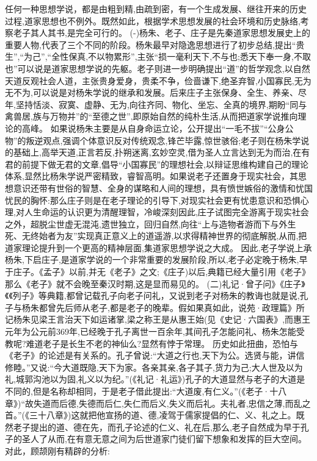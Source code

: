 \documentclass[a4paper,12pt,UTF8,twoside]{ctexbook}
\begin{document}
任何一种思想学说，都是由粗到精,由疏到密，有一个生成发展、继往开来的历史过程,道家思想也不例外。既然如此，根据学术思想发展的社会环境和历史脉络,考察老子其人其书,是完全可行的。
(-)杨朱、老子、庄子是先秦道家思想发展史上的重要人物,代表了三个不同的阶段。杨朱最早对隐逸思想进行了初步总结,提出“贵生”,“为己”,“全性保真,不以物累形”,主张“损一毫利天下,不与也;悉天下奉一身,不取也”可以说是道家思想学说的先躯。老子则进一步明确提出“道”的哲学观念,以自然天道反观社会人道，主张贵身爱身，贵柔不争，俭啬谦下,绝圣弃智,小国寡民,无为无不为,可以说是对杨朱学说的继承和发展。后来庄子主张保身、全生、养亲、尽年,坚持恬淡、寂寞、虚静、无为,向往齐同、物化、坐忘、全真的境界,期盼“同与禽兽居,族与万物并”的“至德之世”,即原始自然的纯朴生活,从而把道家学说推向理论的高峰。
如果说杨朱主要是从自身命运立论，公开提出“一毛不拔”“公身公物”的叛逆观点,强调个体意识反对传统观念,锋芒毕露,惊世骇俗;老子则在杨朱学说的基础上,高举天道,正言若反,扑朔迷离,玄妙空灵,借为圣人立言达到无为而治,在有君的前提下做无君的文章,倡导“小国寡民”的理想社会,以辩证思维构建自己的理论体系,显然比杨朱学说严密精致，睿智高明。如果说老子还置身于现实社会，其思想意识还带有世俗的智慧、全身的谋略和人间的理想，具有愤世嫉俗的激情和忧国忧民的胸怀:那么庄子则是在老子理论的引导下,对现实社会更有忧患意识和恐惧心理,对人生命运的认识更为清醒理智，冷峻深刻因此,庄子试图完全游离于现实社会之外，超脱尘世虚无混沌,遗世独立，回归自然,向往“上与造物者游而下与外生死、无终始者为友”实现真正意义上的道遥游,以求得精神世界的彻底解脱,从而,把道家理论提升到一个更高的精神层面,集道家思想学说之大成。
因此,老子学说上承杨朱,下启庄子,是道家学说的一个非常重要的发展阶段,所以,老子必定晚于杨朱,早于庄子。《孟子》以前,并无《老子》之文;《庄子)以后,典籍已经大量引用《老子》那么《老子》就不会晚至秦汉时期,这是显而易见的。
(二)礼记·曾子问》《庄子》《《列子》等典籍,都曾记载孔子向老子问礼，又说到老子对杨朱的教诲也就是说,孔子与杨朱都曾先后师从老子,都是老子的晚辈。假如果真如此，说苑·政理篇》所记杨朱见梁王言治天下如运诸掌,梁之称王是从惠王始(见《史记·六国表》,而惠王元年为公元前369年,已经晚于孔子离世一百余年,其间孔子怎能问礼、杨朱怎能受教呢?难道老子是长生不老的神仙么?显然有悖于常理。
历史如此扭曲，恐怕与《老子》的论述是有关系的。孔子曾说:“大道之行也,天下为公。选贤与能，讲信修睦。”又说:“今大道既隐,天下为家。各亲其亲,各子其子,货力为己;大人世及以为礼,城郭沟池以为固,礼义以为纪。”(《礼记·礼运》)孔子的大道显然与老子的大道是不同的,但是名称却相同，于是老子借此提出:“大道废,有仁义。”(《老子·十八章》)“故失道而后德,失德而后仁,失仁而后义,失义而后礼。夫礼者,忠信之薄,而乱之首。”(《三十八章》)这就把他宣扬的道、德,凌驾于儒家提倡的仁、义、礼之上。既然老子提出的道、德在先，而孔子论述的仁义、礼在后,那么,老子自然成为早于孔子的圣人了从而,在有意无意之间为后世道家门徒们留下想象和发挥的巨大空间。对此，顾颉刚有精辟的分析:
\end{document}
